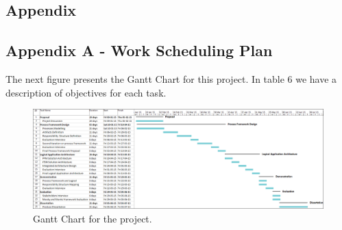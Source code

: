 
\begin{landscape}

\section{Appendix} %
\label{sec:attachments}


\subsection{Appendix A - Work Scheduling Plan} 

The next figure presents the Gantt Chart for this project. In table 6 we have a description of objectives for each task.



\begin{figure}[h!]
\centering
\includegraphics[height=0.55\textheight]{img/GanttChart.png}
\caption{Gantt Chart for the project.}
\end{figure}

\end{landscape}

\newpage



